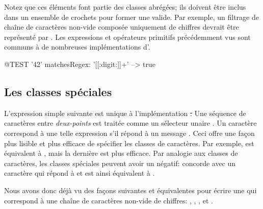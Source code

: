 \documentclass[a4paper,10pt,twoside]{book}
\begin{document}
{Notez que ces éléments font partie des classes abrégées; ils doivent
être inclus dans un ensemble de crochets pour former une \expreg
valide. Par exemple, un filtrage de chaîne de caractères non-vide composée
uniquement de chiffres devrait être représenté par \ct{[[:digit:]]+}.
Les expressions et opérateurs primitifs précédemment vus sont communs
à de nombreuses implémentations d'\expregs.

\begin{code}{@TEST}
'42' matchesRegex: '[[:digit:]]+' --> true
\end{code}

\subsection{Les classes spéciales}
L'expression simple suivante est unique à l'implémentation \st. Une
séquence de caractères entre \emph{deux-points} est traitée comme un
sélecteur unaire .
Un caractère correspond à une telle expression s'il répond 
à un message .
Ceci offre une façon plus lisible et plus efficace de spécifier les
classes de caractères. Par exemple, \ct{[0-9]} est équivalent à
, mais la dernière est plus efficace. Par analogie aux
classes de caractères, les classes spéciales peuvent avoir un négatif:
 concorde avec un caractère qui répond  à
  et est ainsi équivalent à  \ct{[CARET0-9]}.

Nous avons donc déjà vu des façons suivantes et équivalentes pour écrire une \expreg qui
correspond à une chaîne de caractères non-vide de chiffres:
\ct{[0-9]+}, \ct{\d+}, \ct{[\d]+}, \ct{[[:digit:]]+} et .

}
\end{document}
